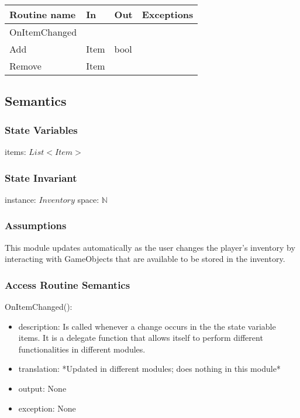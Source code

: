 \documentclass[12pt]{article}
\begin{document}
\begin{tabular}{| l | l | l | l |}
\hline
\textbf{Routine name} & \textbf{In} & \textbf{Out} & \textbf{Exceptions}\\
\hline
OnItemChanged & ~ & ~  & ~\\
Add & Item & bool & ~\\
Remove & Item & ~  & ~\\
\hline
\end{tabular}

\subsection* {Semantics}

\subsubsection* {State Variables}

items: $List<Item>$\\

\subsubsection* {State Invariant}

instance: $Inventory$
space: $\mathbb{N}$

\subsubsection* {Assumptions}

This module updates automatically as the user changes the player's inventory by interacting with GameObjects that are available to be stored in the inventory.

\subsubsection* {Access Routine Semantics}

\noindent OnItemChanged():
\begin{itemize}
\item description: Is called whenever a change occurs in the the state variable items. It is a delegate function that allows itself to perform different functionalities in different modules.
\item translation: *Updated in different modules; does nothing in this module*
\item output: None
\item exception: None
\end{itemize}
\end{document}
